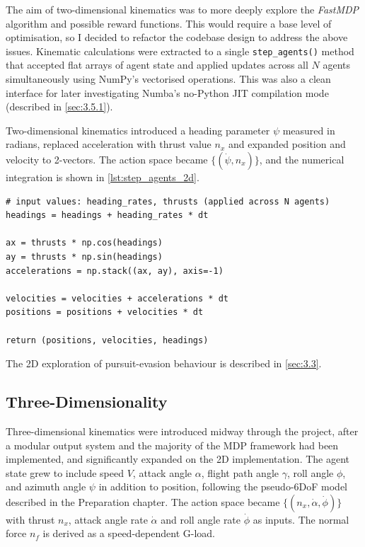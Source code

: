 The aim of two-dimensional kinematics was to more deeply explore the \textit{FastMDP} algorithm and possible reward functions. This would require a base level of optimisation, so I decided to refactor the codebase design to address the above issues. Kinematic calculations were extracted to a single \texttt{step\_agents()} method that accepted flat arrays of agent state and applied updates across all $N$ agents simultaneously using NumPy's vectorised operations. This was also a clean interface for later investigating Numba's no-Python JIT compilation mode (described in \cref{sec:3.5.1}).

Two-dimensional kinematics introduced a heading parameter $\psi$ measured in radians, replaced acceleration with thrust value $n_x$ and expanded position and velocity to 2-vectors. The action space became $\{(\dot{\psi},n_x)\}$, and the numerical integration is shown in \cref{lst:step_agents_2d}.

\begin{listing}[H]
\begin{verbatim}
# input values: heading_rates, thrusts (applied across N agents)
headings = headings + heading_rates * dt

ax = thrusts * np.cos(headings)
ay = thrusts * np.sin(headings)
accelerations = np.stack((ax, ay), axis=-1)

velocities = velocities + accelerations * dt
positions = positions + velocities * dt

return (positions, velocities, headings)
\end{verbatim}
\caption{2D kinematic updates via semi-implicit Euler integration using vectorised operations.}
\label{lst:step_agents_2d}
\end{listing}

The 2D exploration of pursuit-evasion behaviour is described in \cref{sec:3.3}.


\subsection{Three-Dimensionality}
\label{sec:3.2.3}

Three-dimensional kinematics were introduced midway through the project, after a modular output system and the majority of the MDP framework had been implemented, and significantly expanded on the 2D implementation. The agent state grew to include speed $V$, attack angle $\alpha$, flight path angle $\gamma$, roll angle $\phi$, and azimuth angle $\psi$ in addition to position, following the pseudo-6DoF model described in the Preparation chapter. The action space became $\{(n_x, \dot{\alpha}, \dot{\phi})\}$ with thrust $n_x$, attack angle rate $\dot{\alpha}$ and roll angle rate $\dot{\phi}$ as inputs. The normal force $n_f$ is derived as a speed-dependent G-load.

